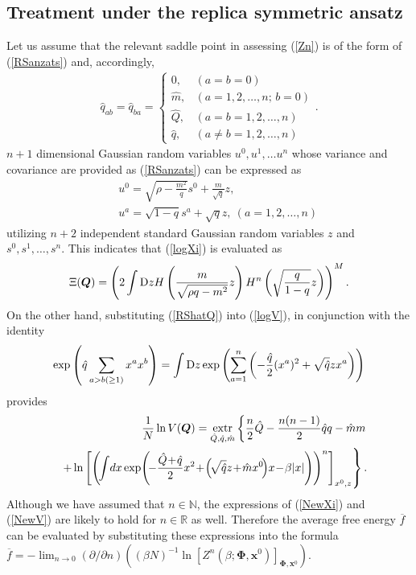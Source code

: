 \documentclass[12pt]{iopart}
\newcommand{\vm}[1]{\boldsymbol{#1}}
\begin{document}
\subsection{Treatment under the replica symmetric ansatz}
Let us assume that the relevant saddle point in assessing (\ref{Zn}) is of the form of (\ref{RSanzats}) and, accordingly, 
\begin{eqnarray}
\hat{q}_{ab}=\hat{q}_{ba} =\left \{
\begin{array}{ll}
0, &( \mbox{$a=b=0$})\\
\hat{m}, &( \mbox{$a=1,2,\ldots,n$; $b=0$})\\
\hat{Q}, &( \mbox{$a=b=1,2,\ldots,n$})\\
\hat{q}, &( \mbox{$a\ne b =1,2,\ldots,n$})
\end{array}
\right .  .
\label{RShatQ}
\end{eqnarray}
$n+1$ dimensional Gaussian random variables $u^0,u^1,\ldots u^n$ whose variance and covariance are provided as (\ref{RSanzats}) can be expressed as 
\begin{eqnarray}
&& u^0=\sqrt{\rho-\frac{m^2}{q}}s^0 + \frac{m}{\sqrt{q}} z, \label{Newgauss0}\\
&& u^a=\sqrt{1-q} s^a+ \sqrt{q} z, \ (a=1,2,\ldots,n) \label{Newgaussa} 
\end{eqnarray}
utilizing $n+2$ independent standard Gaussian random variables $z$ and $s^0,s^1,\ldots,s^n$. This indicates that (\ref{logXi}) is evaluated as
\begin{eqnarray}
\Xi(\vm{Q})=\left (
2 \int {\rm D}z 
H\left (\frac{m}{\sqrt{\rho q-m^2} }z \right )
H^n \left (\sqrt{\frac{q}{1-q}} z \right ) \right )^M. 
\label{NewXi}
\end{eqnarray}
On the other hand, substituting (\ref{RShatQ}) into (\ref{logV}), in conjunction with the identity
\begin{eqnarray}
\exp \left (\hat{q} \sum_{a>b(\ge 1)} x^a x^b \right )=\int {\rm D}z \exp \left (\sum_{a=1}^n 
\left (
-\frac{\hat{q}}{2} (x^a)^2 + \sqrt{\hat{q}} z x^a \right ) \right ) 
\end{eqnarray}
provides 
\begin{eqnarray}
&&\frac{1}{N} \ln V(\vm{Q} )=\mathop{\rm extr}_{\hat{Q}, \hat{q},\hat{m} }
\left \{
\frac{n}{2}\hat{Q}-\frac{n(n-1)}{2} \hat{q}q -\hat{m} m \right . \cr
&&\left . 
+\ln 
\left [\left (
\!
\int 
\!
dx \exp 
\!\left (
\!
-\frac{\hat{Q}
\!+\! \hat{q}}{2} x^2\!+\!\left (\!\sqrt{\hat{q}}z \!+\! \hat{m} x^0 \!\right )
\!x \!-\!\beta |x| \right )
\right )^n \right ]_{x^0,z} \right \}. 
\label{NewV}
\end{eqnarray}
Although we have assumed that $n \in \mathbb{N}$, the expressions of (\ref{NewXi}) and (\ref{NewV}) are likely to hold for $n \in \mathbb{R}$ as well. Therefore the average free energy $\overline{f}$ can be evaluated by substituting these expressions into the formula $\overline{f}= -\lim_{n\to 0} (\partial/\partial n) \left ((\beta N)^{-1} \ln \left [Z^n (\beta; \vm{\Phi},\vm{x}^0 ) \right]_{\vm{\Phi},\vm{x}^0} \right )$. 
\end{document}
